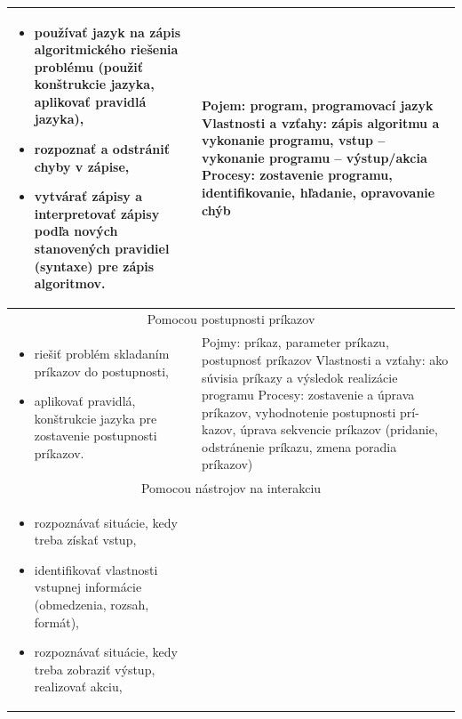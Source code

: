 \documentclass[FP,DP]{tulthesis}
\begin{document}
{{{{\begin{table}[t]
\begin{tabular}{|l|l|}
\begin{minipage}[t]{0.45\textwidth}
\begin{itemize}[leftmargin=*,nosep]
  	\item používať jazyk na zápis algoritmického riešenia problému (použiť
konštrukcie jazyka, aplikovať pravidlá jazyka), 
	\item rozpoznať a odstrániť chyby v zápise,
	\item vytvárať zápisy a interpretovať zápisy podľa nových stanovených
pravidiel (syntaxe) pre zápis algoritmov.
\end{itemize}
  \end{minipage} &
  \begin{minipage}[t]{0.45\textwidth}
Pojem: program, programovací jazyk
Vlastnosti a vzťahy: zápis algoritmu a vykonanie programu, vstup –
vykonanie programu – výstup/akcia
Procesy: zostavenie programu, identifikovanie, hľadanie, opravovanie
chýb
  \end{minipage}\\\hline
\multicolumn{2}{|c|}{Pomocou postupnosti príkazov}\\\hline
\begin{minipage}[t]{0.45\textwidth}
\begin{itemize}[leftmargin=*,nosep]
  	\item riešiť problém skladaním príkazov do postupnosti,
	\item aplikovať pravidlá, konštrukcie jazyka pre zostavenie postupnosti príkazov.
\end{itemize}
  \end{minipage} &
  \begin{minipage}[t]{0.45\textwidth}
Pojmy: príkaz, parameter príkazu, postupnosť príkazov
Vlastnosti a vzťahy: ako súvisia príkazy a výsledok realizácie programu
Procesy: zostavenie a úprava príkazov, vyhodnotenie postupnosti prí-
kazov, úprava sekvencie príkazov (pridanie, odstránenie príkazu, zmena
poradia príkazov)
  \end{minipage}\\\hline
\multicolumn{2}{|c|}{Pomocou nástrojov na interakciu}\\\hline
\begin{minipage}[t]{0.45\textwidth}
\begin{itemize}[leftmargin=*,nosep]
  	\item rozpoznávať situácie, kedy treba získať vstup,
	\item identifikovať vlastnosti vstupnej informácie (obmedzenia, rozsah,
formát),
\item rozpoznávať situácie, kedy treba zobraziť výstup, realizovať akciu,


\end{itemize}
\end{minipage}
\end{tabular}
\end{table}}}}}
\end{document}
